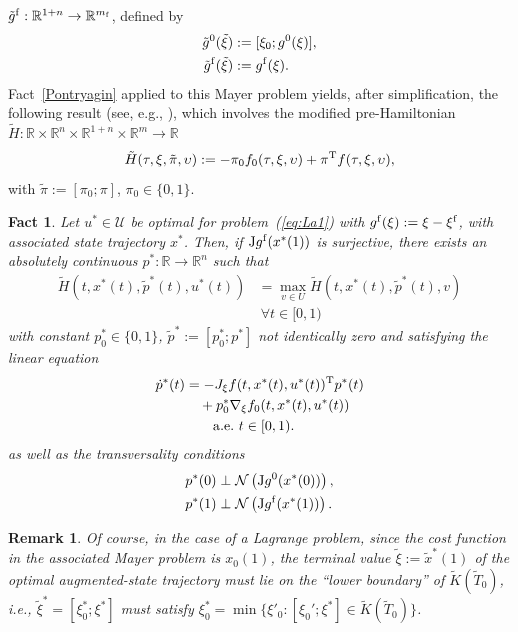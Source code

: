 \documentclass[letterpaper,10pt,conference]{ieeeconf}
\def\R{{\mathbb{R}}}
\newtheorem{fact}{Fact}
\newtheorem{remark}{Remark} %
\begin{document}
$\tilde g^{\rm f}:\R^{1+n}\to\R^{m_{\rm f}}$, defined by
\[
\begin{aligned}
\tilde g^0(\tilde\xi)&:=[\xi_0;g^0(\xi)],\\
\tilde g^{\rm f}(\tilde\xi)&:=g^{\rm f}(\xi).
\end{aligned}
\]
Fact~\ref{Pontryagin} applied to this Mayer problem yields, after
simplification, the following result %
(see, e.g., \cite{Varaiya72:0}), which involves the modified pre-Hamiltonian
$\tilde H:\R\times\R^n\times\R^{1+n}\times\R^m\to\R$
\[
\tilde H(\tau,\xi,\tilde\pi,\upsilon):=
-\pi_0 f_0(\tau,\xi,\upsilon)+\pi^{\rm T}f(\tau,\xi,\upsilon),
\]
with $\tilde\pi:=[\pi_0;\pi]$, $\pi_0\in\{0,1\}$.
\begin{fact}
\label{thm:p0*}
Let $u^*\in\mathcal U$ be optimal for 
problem~(\ref{eq:La1}) with $g^{\rm f}(\xi):=\xi-\xi^{\rm f}$,
with associated state trajectory
$x^*$.  Then, if
${\rm J}g^{\rm f}(x^*(1))$ is surjective,
there exists an absolutely continuous $p^*:\R\to\R^n$
such that
\[
\begin{aligned}
\tilde H(t,x^*(t),\tilde p^*(t),u^*(t))
&=\max_{v\in U} \tilde H(t,x^*(t),\tilde p^*(t),v)\\
&~\forall t\in[0,1)
\end{aligned}
\]
with constant $p_0^*\in\{0,1\}$, $\tilde p^*:=[p_0^*;p^*]$ not identically zero
and satisfying the linear equation
\[
\begin{aligned}
\dot p^*(t)&=-J_\xi f(t,x^*(t),u^*(t))^{\rm T}p^*(t)\\
&\quad+p_0^*\nabla_\xi f_0(t,x^*(t),u^*(t))\\
&\qquad {\rm a.e.~}t\in[0,1).
\end{aligned}
\]
as well as the transversality conditions
\[
\begin{aligned}
p^*(0)&\perp{\mathcal N}\left({\rm J}g^0(x^*(0))\right),\\
p^*(1) &\perp{\mathcal N}\left({\rm J}g^{\rm f}(x^*(1))\right).
\end{aligned}
\]
\end{fact}

\begin{remark}
Of course, in the case of a Lagrange problem, 
since the cost function in the associated Mayer problem is $x_0(1)$,
the terminal value $\tilde\xi:=\tilde x^*(1)$ of the optimal augmented-state 
trajectory 
must lie
on the ``lower boundary'' of $\tilde K(\tilde T_0)$, i.e.,
$\tilde\xi^*=[\xi^*_0;\xi^*]$
must satisfy $\xi_0^*=\min\{\xi'_0:[\xi_0';\xi^*]\in\tilde K(\tilde T_0)\}$.
\end{remark}
\end{document}
